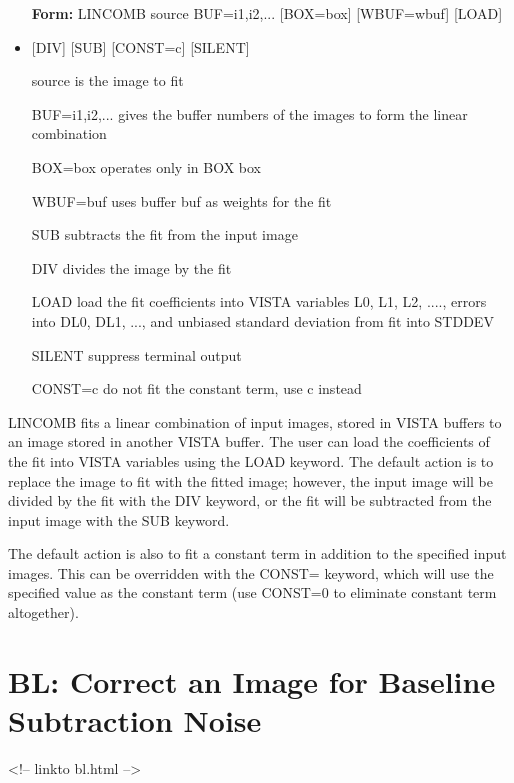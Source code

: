 \begin{itemize}
  \item[\textbf{Form: } LINCOMB source BUF=i1,i2,... {[BOX=box]} 
       {[WBUF=wbuf]} {[LOAD]}\hfill]{}
  \item{{[DIV]} {[SUB]} {[CONST=c]} {[SILENT]}}
  \item[source]{is the image to fit}
  \item[BUF=i1,i2,...]{gives the buffer numbers of the images to form
       the linear combination}
  \item[BOX=box]{operates only in BOX box}
  \item[WBUF=buf]{uses buffer buf as weights for the fit}
  \item[SUB]{subtracts the fit from the input image}
  \item[DIV]{divides the image by the fit}
  \item[LOAD]{load the fit coefficients into VISTA variables
       L0, L1, L2, ...., errors into DL0, DL1, ..., and
       unbiased standard deviation from fit into STDDEV}
  \item[SILENT]{suppress terminal output}
  \item[CONST=c]{do not fit the constant term, use c instead}
\end{itemize}

LINCOMB fits a linear combination of input images, stored in VISTA buffers
to an image stored in another VISTA buffer. The user can load the
coefficients of the fit into VISTA variables using the LOAD keyword. The
default action is to replace the image to fit with the fitted image;
however, the input image will be divided by the fit with the DIV keyword,
or the fit will be subtracted from the input image with the SUB keyword.

The default action is also to fit a constant term in addition to the
specified input images. This can be overridden with the CONST= keyword,
which will use the specified value as the constant term (use CONST=0 to
eliminate constant term altogether).

\section{BL: Correct an Image for Baseline Subtraction Noise}
\begin{rawhtml}
<!-- linkto bl.html -->
\end{rawhtml}

